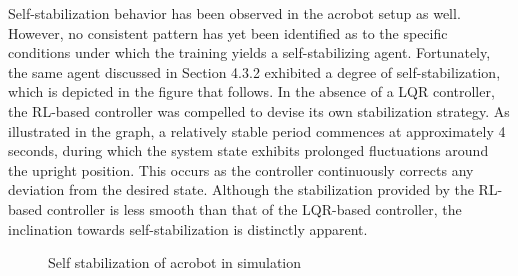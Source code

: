 Self-stabilization behavior has been observed in the acrobot setup as well. However, no consistent pattern has yet been identified as to the specific conditions under which the training yields a self-stabilizing agent. Fortunately, the same agent discussed in Section 4.3.2 exhibited a degree of self-stabilization, which is depicted in the figure that follows. In the absence of a LQR controller, the RL-based controller was compelled to devise its own stabilization strategy. As illustrated in the graph, a relatively stable period commences at approximately 4 seconds, during which the system state exhibits prolonged fluctuations around the upright position. This occurs as the controller continuously corrects any deviation from the desired state. Although the stabilization provided by the RL-based controller is less smooth than that of the LQR-based controller, the inclination towards self-stabilization is distinctly apparent.

\begin{figure}[H]
    \centering
    \caption{Self stabilization of acrobot in simulation}
    \label{fig:acrobot_self_stablization}
\end{figure}

\cleardoublepage
